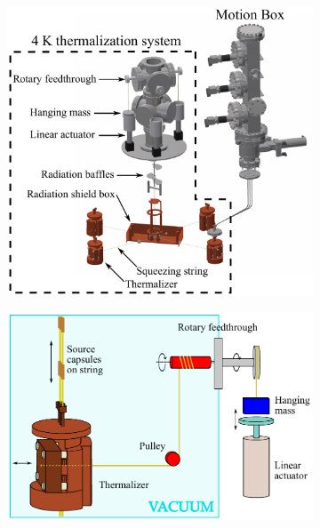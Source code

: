 \begin{figure}[htbp]
\centering
\begin{subfigure}[t]{0.4\textwidth}
\centering
\includegraphics[width=\textwidth]{Figures/thermalization_system_labeled.pdf}
\caption{}
\label{fig:4K_thermalizer_system}
\end{subfigure}
\qquad
\begin{subfigure}[t]{0.4\textwidth}
\centering
\includegraphics[width=\textwidth]{Figures/Thermalizer_schematic_labeled.pdf}
\caption{}
\label{fig:4K_thermalizer_schematic}
\end{subfigure}

\end{figure}
